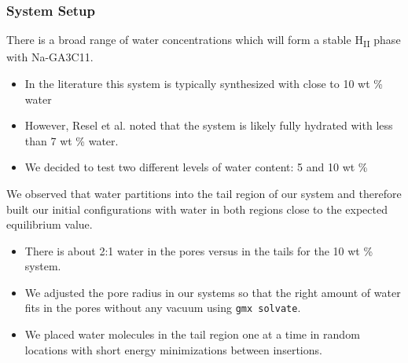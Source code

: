 \documentclass{article}
\begin{document}
  \subsubsection*{System Setup}

  There is a broad range of water concentrations which will form a stable 
  H\textsubscript{II} phase with Na-GA3C11. 
  \begin{itemize}
	\item In the literature this system is typically synthesized with close
	to 10 wt \% water
        \item However, Resel et al. noted that the system is likely fully 
	hydrated with less than 7 wt \% water.
	\item We decided to test two different levels of water content: 5 and 10 wt \%
  \end{itemize} 

  We observed that water partitions into the tail region of our system and therefore
  built our initial configurations with water in both regions close to the expected
  equilibrium value.
  \begin{itemize}
	\item There is about 2:1 water in the pores versus in the tails for the 10 wt \% system.
	\item We adjusted the pore radius in our systems so that the right amount of water
	fits in the pores without any vacuum using \texttt{gmx solvate}.
	\item We placed water molecules in the tail region one at a time in random locations
	with short energy minimizations between insertions.
  \end{itemize}


\end{document}
